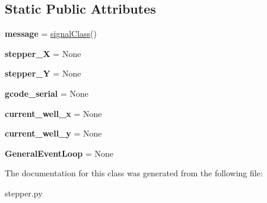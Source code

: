 \subsection*{Static Public Attributes}
\begin{DoxyCompactItemize}
\item 
{\bfseries message} = \hyperlink{classstepper_1_1signal_class}{signal\+Class}()\hypertarget{classstepper_1_1_stepper_wellpositioning_a91a5f9fa5cc56166c7f0285cc045efcb}{}\label{classstepper_1_1_stepper_wellpositioning_a91a5f9fa5cc56166c7f0285cc045efcb}

\item 
{\bfseries stepper\+\_\+X} = None\hypertarget{classstepper_1_1_stepper_wellpositioning_a8e43d8ca4f364d363392c5d4db61f0db}{}\label{classstepper_1_1_stepper_wellpositioning_a8e43d8ca4f364d363392c5d4db61f0db}

\item 
{\bfseries stepper\+\_\+Y} = None\hypertarget{classstepper_1_1_stepper_wellpositioning_a4209be6c39410fdbab036a77d143159a}{}\label{classstepper_1_1_stepper_wellpositioning_a4209be6c39410fdbab036a77d143159a}

\item 
{\bfseries gcode\+\_\+serial} = None\hypertarget{classstepper_1_1_stepper_wellpositioning_ad54c2ae25d71abf8b5baec208b3a7184}{}\label{classstepper_1_1_stepper_wellpositioning_ad54c2ae25d71abf8b5baec208b3a7184}

\item 
{\bfseries current\+\_\+well\+\_\+x} = None\hypertarget{classstepper_1_1_stepper_wellpositioning_a9c966d76add5750f13094b7fe7c02589}{}\label{classstepper_1_1_stepper_wellpositioning_a9c966d76add5750f13094b7fe7c02589}

\item 
{\bfseries current\+\_\+well\+\_\+y} = None\hypertarget{classstepper_1_1_stepper_wellpositioning_ac8f9d5d5af99024d07fb92f9ec3aa0b7}{}\label{classstepper_1_1_stepper_wellpositioning_ac8f9d5d5af99024d07fb92f9ec3aa0b7}

\item 
{\bfseries General\+Event\+Loop} = None\hypertarget{classstepper_1_1_stepper_wellpositioning_a277a31332cb3e97658c4262e2f382892}{}\label{classstepper_1_1_stepper_wellpositioning_a277a31332cb3e97658c4262e2f382892}

\end{DoxyCompactItemize}


The documentation for this class was generated from the following file\+:\begin{DoxyCompactItemize}
\item 
stepper.\+py\end{DoxyCompactItemize}
